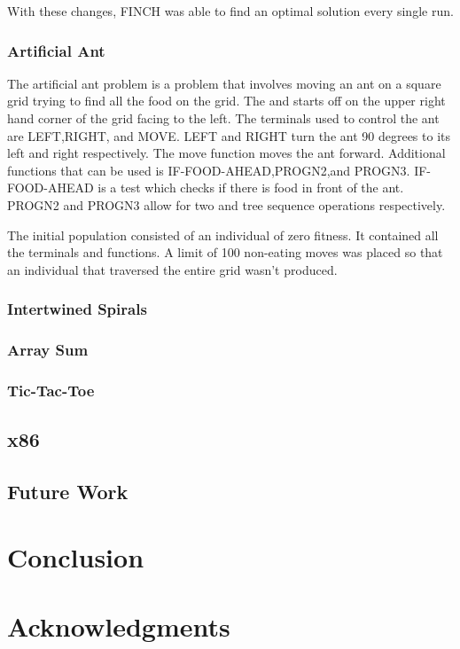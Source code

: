 \documentclass{sig-alternate}
\begin{document}
	With these changes, FINCH was able to find an optimal solution every single run.
	
\subsubsection{Artificial Ant}
	The artificial ant problem is a problem that involves moving an ant on a square grid trying to find all the food on the grid. The and starts off on the upper right hand corner of the grid facing to the left. The terminals used to control the ant are LEFT,RIGHT, and MOVE. LEFT and RIGHT turn the ant 90 degrees to its left and right respectively. The move function moves the ant forward. Additional functions that can be used is IF-FOOD-AHEAD,PROGN2,and PROGN3. IF-FOOD-AHEAD is a test which checks if there is food in front of the ant. PROGN2 and PROGN3 allow for two and tree sequence operations respectively.
	
	The initial population consisted of an individual of zero fitness. It contained all the terminals and functions. A limit of 100 non-eating moves was placed so that an individual that traversed the entire grid wasn't produced.

\subsubsection{Intertwined Spirals}
\subsubsection{Array Sum}
\subsubsection{Tic-Tac-Toe}


\subsection{x86}

\subsection{Future Work}

\section{Conclusion}


\section{Acknowledgments}


%

%
%
\end{document}
